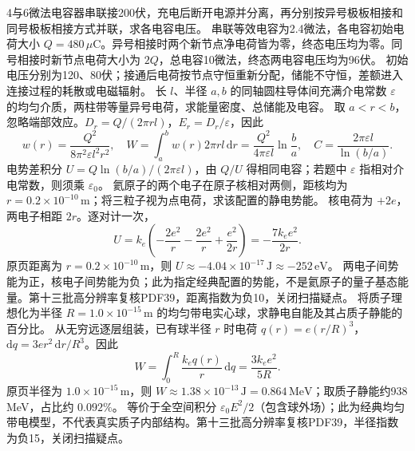 \problemtext 4与6微法电容器串联接200伏，充电后断开电源并分离，再分别按异号极板相接和同号极板相接方式并联，求各电容电压。
\workings 串联等效电容为2.4微法，各电容初始电荷大小 $Q=480\,\mu\mathrm C$。异号相接时两个新节点净电荷皆为零，终态电压均为零。同号相接时新节点电荷大小为 $2Q$，总电容10微法，终态两电容电压均为96伏。
\crosscheck 初始电压分别为120、80伏；接通后电荷按节点守恒重新分配，储能不守恒，差额进入连接过程的耗散或电磁辐射。
\problemtext 长 $l$、半径 $a,b$ 的同轴圆柱导体间充满介电常数 $\varepsilon$ 的均匀介质，两柱带等量异号电荷，求能量密度、总储能及电容。
\workings 取 $a<r<b$，忽略端部效应。$D_r=Q/(2\pi rl)$，$E_r=D_r/\varepsilon$，因此
\[
w(r)=\frac{Q^2}{8\pi^2\varepsilon l^2r^2},\quad
W=\int_a^b w(r)2\pi rl\,\mathrm dr
=\frac{Q^2}{4\pi\varepsilon l}\ln\frac ba,
\quad C=\frac{2\pi\varepsilon l}{\ln(b/a)}.
\]
\crosscheck 电势差积分 $U=Q\ln(b/a)/(2\pi\varepsilon l)$，由 $Q/U$ 得相同电容；若题中 $\varepsilon$ 指相对介电常数，则须乘 $\varepsilon_0$。
\problemtext 氦原子的两个电子在原子核相对两侧，距核均为 $r=0.2\times10^{-10}\,\mathrm m$；将三粒子视为点电荷，求该配置的静电势能。
\workings 核电荷为 $+2e$，两电子相距 $2r$。逐对计一次，
\[
U=k_e\left(-\frac{2e^2}{r}-\frac{2e^2}{r}+\frac{e^2}{2r}\right)
=-\frac{7k_e e^2}{2r}.
\]
原页距离为 $r=0.2\times10^{-10}\,\mathrm m$，则 $U\approx-4.04\times10^{-17}\,\mathrm J\approx-252\,\mathrm{eV}$。
\crosscheck 两电子间势能为正，核电子间势能为负；此为指定经典配置的势能，不是氦原子的量子基态能量。第十三批高分辨率复核PDF39，距离指数为负10，关闭扫描疑点。
\problemtext 将质子理想化为半径 $R=1.0\times10^{-15}\,\mathrm m$ 的均匀带电实心球，求静电自能及其占质子静能的百分比。
\workings 从无穷远逐层组装，已有球半径 $r$ 时电荷 $q(r)=e(r/R)^3$，$\mathrm dq=3er^2\,\mathrm dr/R^3$。因此
\[
W=\int_0^R \frac{k_e q(r)}r\,\mathrm dq
=\frac{3k_e e^2}{5R}.
\]
原页半径为 $1.0\times10^{-15}\,\mathrm m$，则 $W\approx1.38\times10^{-13}\,\mathrm J=0.864\,\mathrm{MeV}$；取质子静能约938 MeV，占比约 $0.092\%$。
\crosscheck 等价于全空间积分 $\varepsilon_0E^2/2$（包含球外场）；此为经典均匀带电模型，不代表真实质子内部结构。第十三批高分辨率复核PDF39，半径指数为负15，关闭扫描疑点。

